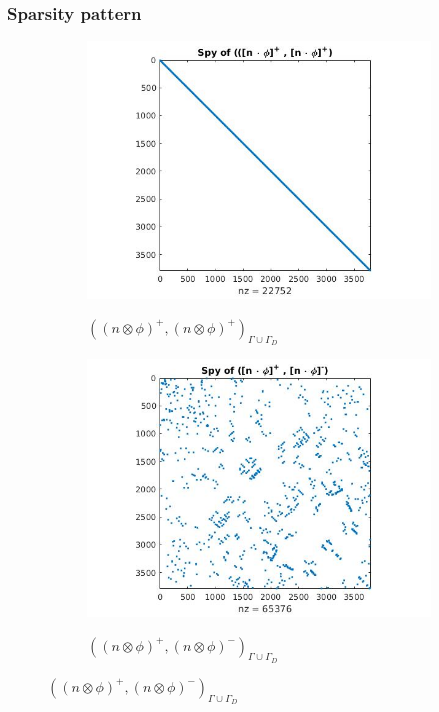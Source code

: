 \documentclass{beamer}
\begin{document}
\begin{frame}
\frametitle{Sparsity pattern}

\begin{figure}
  \begin{subfigure}{0.4\textwidth}
    \includegraphics[width=\linewidth]{figure21.jpg}
    \label{fig:figure21}
	\caption{$((n \otimes \phi)^+,(n \otimes \phi)^+)_{\Gamma \cup \Gamma_D}$}      
  \end{subfigure}
  \begin{subfigure}{0.4\textwidth}
    \includegraphics[width=\linewidth]{figure22.jpg}
    \label{fig:figure22}
	\caption{$((n \otimes \phi)^+,(n \otimes \phi)^-)_{\Gamma \cup \Gamma_D}$}      
  \end{subfigure}

\end{figure}
\end{frame}
\end{document}
